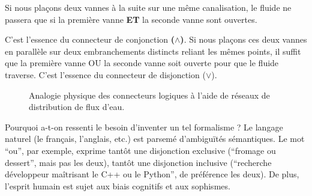 \documentclass[11pt,a4paper]{article}
\begin{document}
Si nous plaçons deux vannes à la suite sur une même canalisation, le
fluide ne passera que si la première vanne \textbf{ET} la seconde vanne
sont ouvertes.

C'est l'essence du connecteur de conjonction \textbf{(\(\land\))}. Si
nous plaçons ces deux vannes en parallèle sur deux embranchements
distincts reliant les mêmes points, il suffit que la première vanne OU
la seconde vanne soit ouverte pour que le fluide traverse. C'est
l'essence du connecteur de disjonction (\(\lor\)).


\begin{figure}[htbp]
\centering
{}
\caption{Analogie physique des connecteurs logiques à l'aide de réseaux de distribution de flux d'eau.}
\label{fig:logic-gates}
\end{figure}


Pourquoi a-t-on ressenti le besoin d'inventer un tel formalisme ? Le
langage naturel (le français, l'anglais, etc.) est parsemé d'ambiguïtés
sémantiques. Le mot ``ou'', par exemple, exprime tantôt une disjonction
exclusive (``fromage ou dessert'', mais pas les deux), tantôt une
disjonction inclusive (``recherche développeur maîtrisant le C++ ou le
Python'', de préférence les deux). De plus, l'esprit humain est sujet
aux biais cognitifs et aux sophismes.
\end{document}
